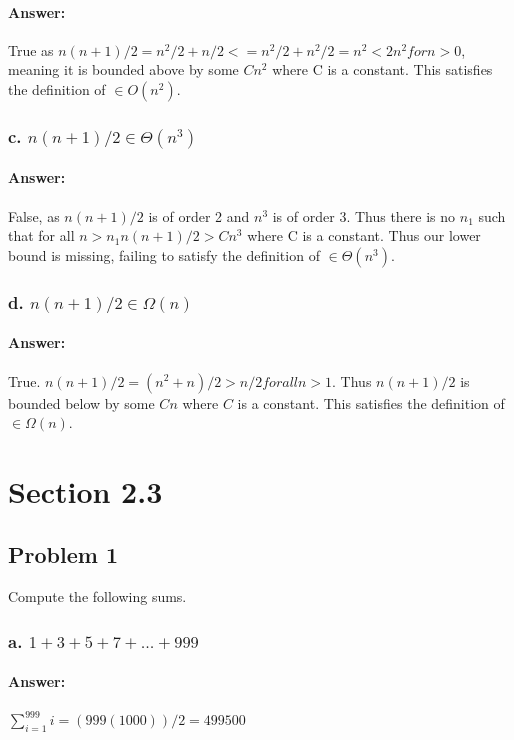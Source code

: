 \documentclass{article}
\begin{document}
    \paragraph{Answer: \newline}
      True as $n(n+1)/2 = n^2/2 + n/2 <= n^2/2 + n^2/2 = n^2 < 2n^2 for n>0$, meaning it is bounded above by some $Cn^2$ where C is a constant. This satisfies the definition of $\in O(n^2)$.
  \subsubsection{c. $n(n + 1)/2 \in \Theta(n^3 )$}
    \paragraph{Answer: \newline}
      False, as $n(n+1)/2$ is of order 2 and $n^3$ is of order 3. Thus there is no $n_{1}$ such that
      for all $n>n_{1} n(n+1)/2 > Cn^3$ where C is a constant. Thus our lower bound is missing, failing to satisfy the definition of $\in \Theta(n^3)$.
  \subsubsection{d. $n(n + 1)/2 \in \Omega(n)$}
    \paragraph{Answer: \newline}
      True. $n(n+1)/2 = (n^2+n)/2 > n/2 for all n>1$. Thus $n(n+1)/2$ is bounded below by some $Cn$ where $C$ is a constant. This satisfies the definition of $\in \Omega(n)$.
\section{Section 2.3}
  \subsection{Problem 1}
    Compute the following sums.
  \subsubsection{a. $1 + 3 + 5 + 7 + . . . + 999$}
    \paragraph{Answer: \newline}
      $\sum\limits_{i=1}^{999}i = (999(1000))/2 = 499500$
\end{document}
